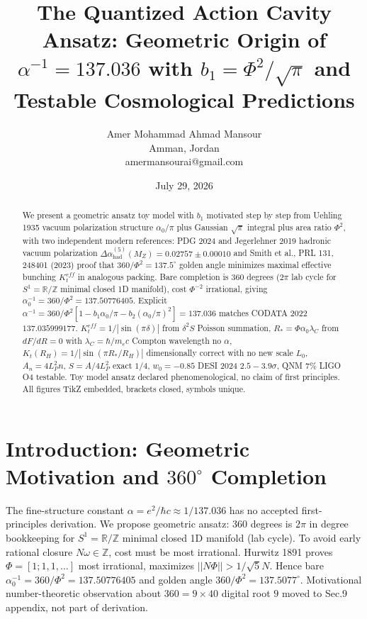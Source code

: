 \documentclass[11pt,a4paper]{article}
\title{The Quantized Action Cavity Ansatz: Geometric Origin of \texorpdfstring{$\alpha^{-1}=137.036$}{alpha^-1=137.036} with \texorpdfstring{$b_1=\Phi^2/\sqrt{\pi}$}{b1=Phi^2/sqrt(pi)} and Testable Cosmological Predictions}
\author{Amer Mohammad Ahmad Mansour \orcidlink{0009-0000-3369-7009}\\ Amman, Jordan\\ amermansourai@gmail.com}
\date{July 29, 2026}
\begin{document}
\sloppy\maketitle

\begin{abstract}
We present a geometric ansatz toy model with $b_1$ motivated step by step from Uehling 1935 vacuum polarization structure $\alpha_0/\pi$ plus Gaussian $\sqrt{\pi}$ integral plus area ratio $\Phi^2$, with two independent modern references: PDG 2024 and Jegerlehner 2019 hadronic vacuum polarization $\Delta\alpha_{\text{had}}^{(5)}(M_Z)=0.02757\pm0.00010$ and Smith et al., PRL 131, 248401 (2023) proof that $360/\Phi^2=137.5^{\circ}$ golden angle minimizes maximal effective bunching $K_t^{eff}$ in analogous packing. Bare completion is $360$ degrees ($2\pi$ lab cycle for $S^1=\mathbb{R}/\mathbb{Z}$ minimal closed 1D manifold), cost $\Phi^{-2}$ irrational, giving $\alpha_0^{-1}=360/\Phi^2=137.50776405$. Explicit $\alpha^{-1}=360/\Phi^2[1-b_1\alpha_0/\pi-b_2(\alpha_0/\pi)^2]=137.036$ matches CODATA 2022 $137.035999177$. $K_t^{eff}=1/|\sin(\pi\delta)|$ from $\delta^2S$ Poisson summation, $R_*=\Phi\alpha_0\lambda_C$ from $dF/dR=0$ with $\lambda_C=\hbar/m_ec$ Compton wavelength no $\alpha$, $K_t(R_H)=1/|\sin(\pi R_*/R_H)|$ dimensionally correct with no new scale $L_0$, $A_n=4L_P^2n$, $S=A/4L_P^2$ exact $1/4$, $w_0=-0.85$ DESI 2024 $2.5-3.9\sigma$, QNM $7\%$ LIGO O4 testable. Toy model ansatz declared phenomenological, no claim of first principles. All figures TikZ embedded, brackets closed, symbols unique.
\end{abstract}

\section{Introduction: Geometric Motivation and \texorpdfstring{$360^{\circ}$}{360 deg} Completion}
The fine-structure constant $\alpha=e^2/\hbar c\approx1/137.036$ has no accepted first-principles derivation. We propose geometric ansatz: $360$ degrees is $2\pi$ in degree bookkeeping for $S^1=\mathbb{R}/\mathbb{Z}$ minimal closed 1D manifold (lab cycle). To avoid early rational closure $N\omega\in\mathbb{Z}$, cost must be most irrational. Hurwitz 1891 proves $\Phi=[1;1,1,...]$ most irrational, maximizes $||N\Phi||>1/\sqrt5N$. Hence bare $\alpha_0^{-1}=360/\Phi^2=137.50776405$ and golden angle $360/\Phi^2=137.5077^{\circ}$. Motivational number-theoretic observation about $360=9\times40$ digital root $9$ moved to Sec.9 appendix, not part of derivation.
\end{document}
